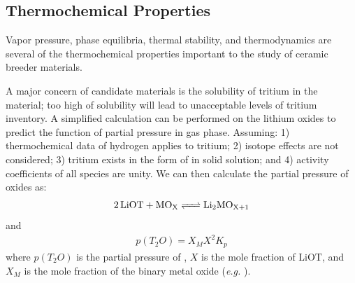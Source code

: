 \documentclass[11pt]{report} %
\newcommand{\lisix}{\ce{^6Li}}
\begin{document}





\subsection{Thermochemical Properties}
Vapor pressure, phase equilibria, thermal stability, and thermodynamics are several of the thermochemical properties important to the study of ceramic breeder materials. 

A major concern of candidate materials is the solubility of tritium in the material; too high of solubility will lead to unacceptable levels of tritium inventory. A simplified calculation can be performed on the lithium oxides to predict the function of  partial pressure in gas phase. Assuming: 1) thermochemical data of hydrogen applies to tritium; 2) isotope effects are not considered; 3) tritium exists in the form of  in solid solution; and 4) activity coefficients of all species are unity. We can then calculate the partial pressure of oxides as:
\begin{align}\label{eq:liot-equilibrium}
\ce{2LiOT + MO_X <=> Li2MO_{X+1}}
\end{align}
and
\begin{align}
p(T_2O) = X_MX^2K_p
\end{align}
where $p(T_2O)$ is the partial pressure of , $X$ is the mole fraction of LiOT, and $X_M$ is the mole fraction of the binary metal oxide (\textit{e.g.} ). 
\end{document}
